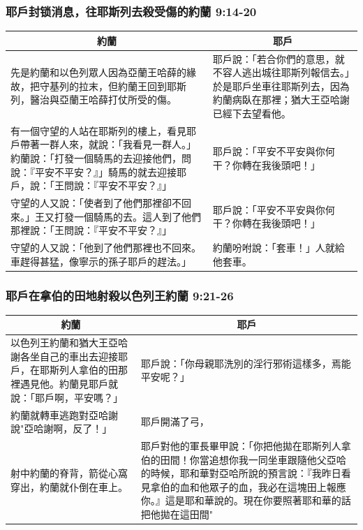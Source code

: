 \subsubsection{耶戶封锁消息，往耶斯列去殺受傷的約蘭 9:14-20}
\begin{table}[H]
\centering
\begin{tabular}{p{9.5cm}|p{7.75cm}}\hline
\multicolumn{1}{c}{約蘭}&\multicolumn{1}{c}{耶戶}\\\hline
先是約蘭和以色列眾人因為亞蘭王哈薛的緣故，把守基列的拉末，但約蘭王回到耶斯列，醫治與亞蘭王哈薛打仗所受的傷。&耶戶說：「若合你們的意思，就不容人逃出城往耶斯列報信去。」於是耶戶坐車往耶斯列去，因為約蘭病臥在那裡；猶大王亞哈謝已經下去望看他。\\\hline
有一個守望的人站在耶斯列的樓上，看見耶戶帶著一群人來，就說：「我看見一群人。」約蘭說：「打發一個騎馬的去迎接他們，問說：『平安不平安？』」騎馬的就去迎接耶戶，說：「王問說：『平安不平安？』」&耶戶說：「平安不平安與你何干？你轉在我後頭吧！」\\\hline
守望的人又說：「使者到了他們那裡卻不回來。」王又打發一個騎馬的去。這人到了他們那裡說：「王問說：『平安不平安？』」&耶戶說：「平安不平安與你何干？你轉在我後頭吧！」\\\hline
守望的人又說：「他到了他們那裡也不回來。車趕得甚猛，像寧示的孫子耶戶的趕法。」&約蘭吩咐說：「套車！」人就給他套車。\\\hline
\end{tabular}
\end{table}


\subsubsection{耶戶在拿伯的田地射殺以色列王約蘭 9:21-26 }
\begin{table}[H]
\hspace{-5mm}
\centering
\begin{tabular}{p{7.5cm}|p{}}\hline
\multicolumn{1}{c}{約蘭}&\multicolumn{1}{c}{耶戶}\\\hline
以色列王約蘭和猶大王亞哈謝各坐自己的車出去迎接耶戶，在耶斯列人拿伯的田那裡遇見他。約蘭見耶戶就說：「耶戶啊，平安嗎？」&耶戶說：「你母親耶洗別的淫行邪術這樣多，焉能平安呢？」\\\hline
約蘭就轉車逃跑對亞哈謝說"亞哈謝啊，反了！」&耶戶開滿了弓，\\\hline
射中約蘭的脊背，箭從心窩穿出，約蘭就仆倒在車上。&耶戶對他的軍長畢甲說：「你把他拋在耶斯列人拿伯的田間！你當追想你我一同坐車跟隨他父亞哈的時候，耶和華對亞哈所說的預言說：『我昨日看見拿伯的血和他眾子的血，我必在這塊田上報應你。』這是耶和華說的。現在你要照著耶和華的話把他拋在這田間"\\\hline
\end{tabular}
\end{table}


